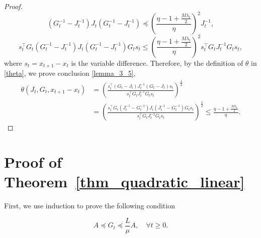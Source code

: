 \documentclass[11pt]{article}
\numberwithin{assumption}{section}
\numberwithin{remark}{section}
\numberwithin{theorem}{section}
\begin{document}
\begin{proof}
\begin{equation}
    (G^{-1}_t - J^{-1}_t)J_t(G^{-1}_t - J^{-1}_t) \preceq \left(\frac{\eta - 1 + \frac{M\lambda_t}{2}}{\eta}\right)^2 J^{-1}_t,
\end{equation}
\begin{equation}
    s_t^\top G_t(G^{-1}_t - J^{-1}_t)J_t(G^{-1}_t - J^{-1}_t)G_t s_t \leq \left(\frac{\eta - 1 + \frac{M\lambda_t}{2}}{\eta}\right)^2 s_t^\top G_tJ ^{-1}_t G_t s_t,
\end{equation}
where $s_t = x_{t + 1} - x_t$ is the variable difference. Therefore, by the definition of $\theta$ in \eqref{theta}, we prove conclusion \eqref{lemma_3_5},
\begin{equation}
\begin{split}
    \theta(J_t, G_t, x_{t + 1} - x_{t}) & = \left(\frac{s_t^\top (G_t - J_t) J_t^{-1} (G_t - J_t) s_t}{s_t^\top G_t J_t^{-1} G_t s_t}\right)^{\frac{1}{2}}\\
    & = \left(\frac{s_t^\top G_t(J_t^{-1} - G_t^{-1})J_t(J_t^{-1} - G_t^{-1}) G_ts_t}{s_t^\top G_t J_t^{-1} G_t s_t}\right)^{\frac{1}{2}} \leq \frac{\eta - 1 + \frac{M\lambda_t}{2}}{\eta}.
\end{split}
\end{equation}

\end{proof}

\section{Proof of Theorem~\ref{thm_quadratic_linear}}\label{sec:proof_of_thm_quadratic_linear}

First, we use induction to prove the following condition

\begin{equation}\label{proof_thm_quadratic_linear_1}
A \preceq G_t \preceq \frac{L}{\mu}A, \quad \forall t \geq 0.
\end{equation}
\end{document}
